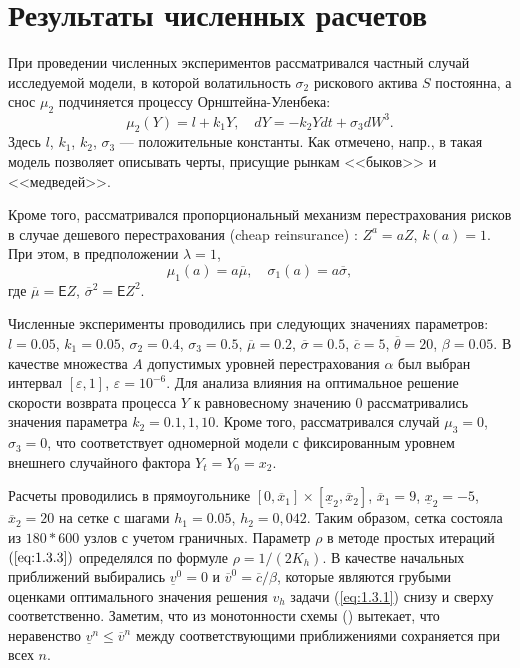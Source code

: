 \section{Результаты численных расчетов} \label{sect:1.4}
При проведении численных экспериментов рассматривался частный случай исследуемой модели, в которой волатильность $\sigma_2$ рискового актива $S$ постоянна, а снос $\mu_2$ подчиняется процессу Орнштейна-Уленбека:
$$\mu_2(Y)  =l+ k_1 Y,\quad  dY=-k_2 Y dt + \sigma_3 dW^3. $$
Здесь $l$, $k_1$, $k_2$, $\sigma_3$ --- положительные константы. Как отмечено, напр.,  в \cite{Ris99, LiaYueGuo11} такая модель позволяет описывать черты, присущие рынкам <<быков>> и <<медведей>>.

Кроме того, рассматривался пропорциональный механизм перестрахования рисков в случае дешевого перестрахования (cheap reinsurance) \cite{AsmHojTak00}: $Z^a=aZ$, $k(a)=1$. При этом, в предположении $\lambda=1$,
\begin{equation}
\mu_1(a)=a \overline\mu,\quad \sigma_1 (a)=a\overline\sigma,
\end{equation}
где  $\overline\mu=\mathsf E Z$, $\overline\sigma^2=\mathsf E Z^2$.

Численные эксперименты проводились при следующих значениях параметров:  $l=0.05$, $k_1=0.05$, $\sigma_2=0.4$, $\sigma_3=0.5$, $\overline\mu  =0.2$, $\overline\sigma=0.5$, $\overline c=5$, $\overline\theta=20$, $\beta=0.05$. В качестве множества $A$ допустимых уровней перестрахования $\alpha$ был выбран интервал $[\varepsilon,1]$, $\varepsilon=10^{-6}$. Для анализа влияния на оптимальное решение скорости возврата процесса $Y$ к равновесному значению $0$ рассматривались значения параметра $k_2=0.1 , 1, 10$. Кроме того, рассматривался случай $\mu_3=0$, $\sigma_3=0$, что соответствует одномерной модели с фиксированным уровнем внешнего случайного фактора $Y_t = Y_0=x_2$.

Расчеты проводились в прямоугольнике $[0,\overline x_1]\times [\underline x_2,\overline x_2]$, $\overline x_1=9$, $\underline x_2=-5$, $\overline x_2=20$  на сетке с шагами $h_1=0.05$, $h_2=0,042$. Таким образом, сетка состояла из $180*600$ узлов с учетом граничных. Параметр $\rho$ в методе простых итераций $(\ref{eq:1.3.3})$ определялся по формуле $\rho=1/(2 K_h)$. В качестве начальных приближений выбирались $\underline v^0=0$ и $\overline v^0= \overline c / \beta$, которые являются грубыми оценками оптимального значения решения $v_h$ задачи (\ref{eq:1.3.1}) снизу и сверху соответственно.  Заметим, что из монотонности схемы (\cite[теорема 6]{Obe06}) вытекает, что неравенство $\underline v^n\le\overline v^n$ между соответствующими приближениями сохраняется при всех $n$.

